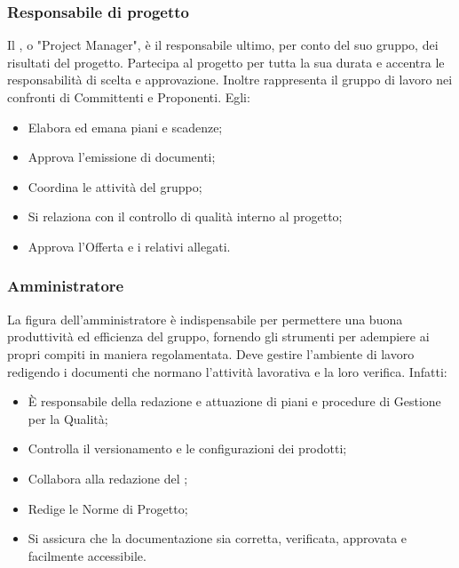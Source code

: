 \documentclass[NormeDiProgetto.tex]{subfiles}
\begin{document}
	\subsubsection{Responsabile di progetto}
	Il \respdiprog, o "Project Manager", è il responsabile ultimo, per conto del suo gruppo, dei risultati del progetto. Partecipa al progetto per tutta la sua durata e accentra le responsabilità di scelta e approvazione. Inoltre rappresenta il gruppo di lavoro nei confronti di Committenti e Proponenti. Egli:
	\begin{itemize}
		\item Elabora ed emana piani e scadenze;
		\item Approva l'emissione di documenti;
		\item Coordina le attività del gruppo;
		\item Si relaziona con il controllo di qualità interno al progetto;
		\item Approva l'Offerta e i relativi allegati.
	\end{itemize}

	\subsubsection{Amministratore}
	La figura dell'amministratore è indispensabile per permettere una buona produttività ed efficienza del gruppo, fornendo gli strumenti per adempiere ai propri compiti in maniera regolamentata. Deve gestire l'ambiente di lavoro redigendo i documenti che normano l'attività lavorativa e la loro verifica. Infatti:
	\begin{itemize}
		\item È responsabile della redazione e attuazione di piani e procedure di Gestione per la Qualità;
		\item Controlla il versionamento e le configurazioni dei prodotti;
		\item Collabora alla redazione del \pdp;
		\item Redige le Norme di Progetto;
		\item Si assicura che la documentazione sia corretta, verificata, approvata e facilmente accessibile.
	\end{itemize}
\end{document}
